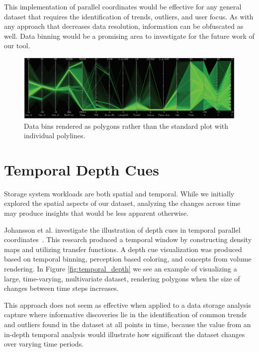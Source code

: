 \documentclass[12pt]{ucthesis}
\begin{document}
This implementation of parallel coordinates would be effective for any general dataset that requires the identification of trends, outliers, and user focus. As with any approach that decreases data resolution, information can be obfuscated as well. Data binning would be a promising area to investigate for the future work of our tool.

\begin{figure}[h!]
 \centering
 \includegraphics[width=\textwidth]{images/data_binning.jpg}
 \caption[Data bins rendered as polygons rather than individual polylines.]{Data bins rendered as polygons rather than the standard plot with individual polylines.}
 \label{fig:data_binning}
\end{figure}

\section{Temporal Depth Cues}
\label{temporal_depth_cues}

Storage system workloads are both spatial and temporal. While we initially explored the spatial aspects of our dataset, analyzing the changes across time may produce insights that would be less apparent otherwise.

Johansson et al. investigate the illustration of depth cues in temporal parallel coordinates~\cite{johansson:2007:DCDTPC}. This research produced a temporal window by constructing density maps and utilizing transfer functions. A depth cue visualization was produced based on temporal binning, perception based coloring, and concepts from volume rendering. In Figure \ref{fig:temporal_depth} we see an example of visualizing a large, time-varying, multivariate dataset, rendering polygons when the size of changes between time steps increases.

This approach does not seem as effective when applied to a data storage analysis capture where informative discoveries lie in the identification of common trends and outliers found in the dataset at all points in time, because the value from an in-depth temporal analysis would illustrate how significant the dataset changes over varying time periods.
\end{document}
